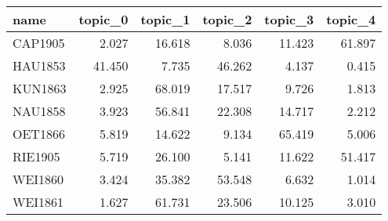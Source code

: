 \begin{tabular}{lrrrrr}
\toprule
   name &  topic\_0 &  topic\_1 &  topic\_2 &  topic\_3 &  topic\_4 \\
\midrule
CAP1905 &    2.027 &   16.618 &    8.036 &   11.423 &   61.897 \\
HAU1853 &   41.450 &    7.735 &   46.262 &    4.137 &    0.415 \\
KUN1863 &    2.925 &   68.019 &   17.517 &    9.726 &    1.813 \\
NAU1858 &    3.923 &   56.841 &   22.308 &   14.717 &    2.212 \\
OET1866 &    5.819 &   14.622 &    9.134 &   65.419 &    5.006 \\
RIE1905 &    5.719 &   26.100 &    5.141 &   11.622 &   51.417 \\
WEI1860 &    3.424 &   35.382 &   53.548 &    6.632 &    1.014 \\
WEI1861 &    1.627 &   61.731 &   23.506 &   10.125 &    3.010 \\
\bottomrule
\end{tabular}
